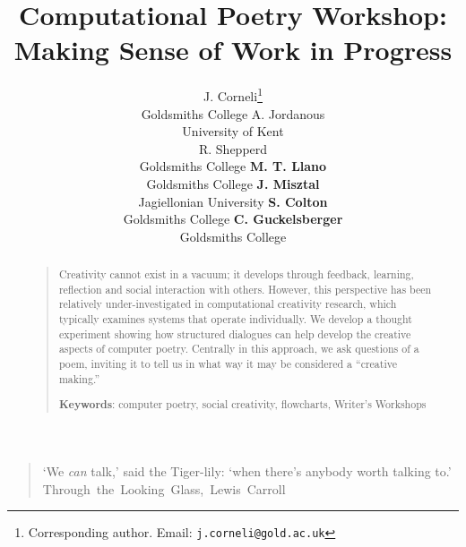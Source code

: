 \documentclass[letterpaper]{article}
\title{Computational Poetry Workshop: Making Sense of Work in Progress}
\author{J. Corneli\thanks{Corresponding author. Email: {\tt j.corneli@gold.ac.uk}} \\ Goldsmiths College
\And A. Jordanous \\ University of Kent \\
\And R. Shepperd \\ Goldsmiths College
\And \textbf{M. T. Llano}  \\ Goldsmiths College
\AND \textbf{J. Misztal}  \\ Jagiellonian University
\And \textbf{S. Colton}  \\ Goldsmiths College
\And \textbf{C. Guckelsberger}  \\ Goldsmiths College
}
\newcommand*{\sourceatright}[1]{\unskip\hspace{1em plus 1fill}%
\nolinebreak[3]\hspace*{\fill}\mbox{#1}}%
\begin{document}
 
\maketitle
\begin{abstract}
\begin{quote}
Creativity cannot exist in a vacuum; it develops through feedback,
learning, reflection and social interaction with others. However, this perspective
has been relatively under-investigated in computational creativity
research, which typically examines systems that operate
individually. 
We develop a thought experiment showing how structured dialogues can help develop the
creative aspects of computer poetry.
Centrally in this approach, we ask questions of a poem, inviting it to tell us in what way it may be considered a ``creative making.''


\medskip

\textbf{Keywords}: computer poetry, social creativity, flowcharts, Writer's Workshops
\end{quote}
\end{abstract}





\begin{quote}
{\small `We \emph{can} talk,' said the Tiger-lily: `when there's anybody worth talking to.'\\
\sourceatright{Through the Looking Glass, Lewis Carroll}}
\end{quote}
\end{document}
